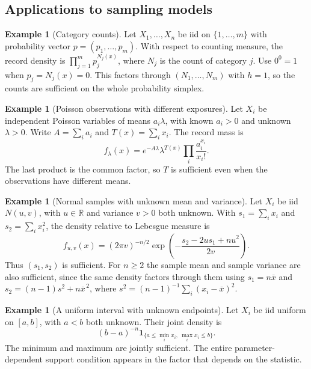 \documentclass[11pt,oneside]{book}
\theoremstyle{definition}
\newtheorem{example}[theorem]{Example}
\theoremstyle{remark}
\newcommand{\R}{\mathbb R}
\begin{document}
\subsection{Applications to sampling models}
\label{subsec:factorization-sampling-models}

\begin{example}[Category counts]
\label{ex:factorization-category-counts}
Let $X_1,\ldots,X_n$ be iid on $\{1,\ldots,m\}$ with probability
vector $p=(p_1,\ldots,p_m)$. With respect to counting measure,
the record density is $\prod_{j=1}^m p_j^{N_j(x)}$, where $N_j$
is the count of category $j$. Use $0^0=1$ when $p_j=N_j(x)=0$.
This factors through $(N_1,\ldots,N_m)$ with $h=1$, so the counts
are sufficient on the whole probability simplex.
\end{example}

\begin{example}[Poisson observations with different exposures]
\label{ex:factorization-poisson-exposures}
Let $X_i$ be independent Poisson variables of means $a_i\lambda$,
with known $a_i>0$ and unknown $\lambda>0$. Write $A=\sum_i a_i$
and $T(x)=\sum_i x_i$. The record mass is
\[
f_\lambda(x)=e^{-A\lambda}\lambda^{T(x)}
\prod_i \frac{a_i^{x_i}}{x_i!}.
\]
The last product is the common factor, so $T$ is sufficient even
when the observations have different means.
\end{example}

\begin{example}[Normal samples with unknown mean and variance]
\label{ex:factorization-normal-two-summaries}
Let $X_i$ be iid $N(u,v)$, with $u\in\R$ and variance $v>0$
both unknown. With $s_1=\sum_i x_i$ and $s_2=\sum_i x_i^2$,
the density relative to Lebesgue measure is
\[
f_{u,v}(x)=(2\pi v)^{-n/2}
\exp\!\left(-\frac{s_2-2us_1+nu^2}{2v}\right).
\]
Thus $(s_1,s_2)$ is sufficient. For $n\geq2$ the sample mean
and sample variance are also sufficient, since the same density factors through them using
$s_1=n\overline x$ and $s_2=(n-1)s^2+n\overline x^{\,2}$, where
$s^2=(n-1)^{-1}\sum_i(x_i-\overline x)^2$.
\end{example}

\begin{example}[A uniform interval with unknown endpoints]
\label{ex:factorization-uniform-two-endpoints}
Let $X_i$ be iid uniform on $[a,b]$, with $a<b$ both unknown.
Their joint density is
\[
(b-a)^{-n}\mathbf 1_{\{a\leq\min_i x_i,\ \max_i x_i\leq b\}} .
\]
The minimum and maximum are jointly sufficient. The entire
parameter-dependent support condition appears in the factor
that depends on the statistic.
\end{example}
\end{document}
